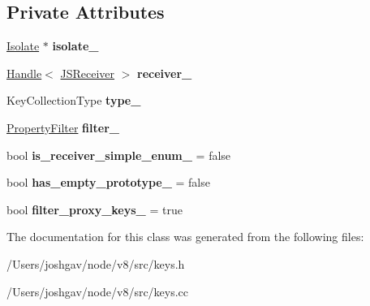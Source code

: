 \subsection*{Private Attributes}
\begin{DoxyCompactItemize}
\item 
\hyperlink{classv8_1_1internal_1_1_isolate}{Isolate} $\ast$ {\bfseries isolate\+\_\+}\hypertarget{classv8_1_1internal_1_1_fast_key_accumulator_a9b1d4330f2a60da2969ef8f67db71f85}{}\label{classv8_1_1internal_1_1_fast_key_accumulator_a9b1d4330f2a60da2969ef8f67db71f85}

\item 
\hyperlink{classv8_1_1internal_1_1_handle}{Handle}$<$ \hyperlink{classv8_1_1internal_1_1_j_s_receiver}{J\+S\+Receiver} $>$ {\bfseries receiver\+\_\+}\hypertarget{classv8_1_1internal_1_1_fast_key_accumulator_adaa5f789664e32a0302c79688e46f14a}{}\label{classv8_1_1internal_1_1_fast_key_accumulator_adaa5f789664e32a0302c79688e46f14a}

\item 
Key\+Collection\+Type {\bfseries type\+\_\+}\hypertarget{classv8_1_1internal_1_1_fast_key_accumulator_a41a089c606f5991ebd3940d7715eabf4}{}\label{classv8_1_1internal_1_1_fast_key_accumulator_a41a089c606f5991ebd3940d7715eabf4}

\item 
\hyperlink{namespacev8_afbf02b6b1152a3e25d7bde90798209ac}{Property\+Filter} {\bfseries filter\+\_\+}\hypertarget{classv8_1_1internal_1_1_fast_key_accumulator_a47d649d939c19e6adba8506487bd12fa}{}\label{classv8_1_1internal_1_1_fast_key_accumulator_a47d649d939c19e6adba8506487bd12fa}

\item 
bool {\bfseries is\+\_\+receiver\+\_\+simple\+\_\+enum\+\_\+} = false\hypertarget{classv8_1_1internal_1_1_fast_key_accumulator_aca697685c9124c1ef6669f75b2e0aa09}{}\label{classv8_1_1internal_1_1_fast_key_accumulator_aca697685c9124c1ef6669f75b2e0aa09}

\item 
bool {\bfseries has\+\_\+empty\+\_\+prototype\+\_\+} = false\hypertarget{classv8_1_1internal_1_1_fast_key_accumulator_ab39eb6bfaa5cae86f9e2e196a276fcd3}{}\label{classv8_1_1internal_1_1_fast_key_accumulator_ab39eb6bfaa5cae86f9e2e196a276fcd3}

\item 
bool {\bfseries filter\+\_\+proxy\+\_\+keys\+\_\+} = true\hypertarget{classv8_1_1internal_1_1_fast_key_accumulator_ab455ae5e7c6b4380f4d54decb3026c39}{}\label{classv8_1_1internal_1_1_fast_key_accumulator_ab455ae5e7c6b4380f4d54decb3026c39}

\end{DoxyCompactItemize}


The documentation for this class was generated from the following files\+:\begin{DoxyCompactItemize}
\item 
/\+Users/joshgav/node/v8/src/keys.\+h\item 
/\+Users/joshgav/node/v8/src/keys.\+cc\end{DoxyCompactItemize}
